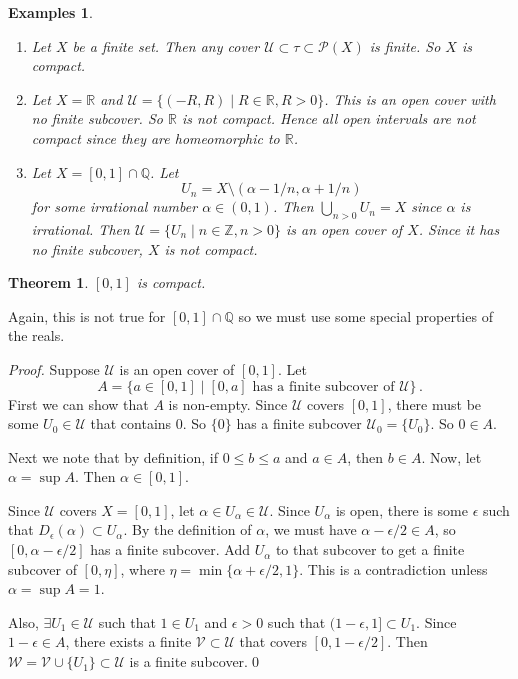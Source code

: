\documentclass{article}
\theoremstyle{plain}\theoremheaderfont{\normalfont\itshape}\theorembodyfont{\rmfamily}\theoremseparator{.}\newtheorem*{rem}{Remark}\newtheorem*{ex}{Example}\newtheorem*{proof}{Proof}\newtheorem*{altp}{Alternative proof}
\theoremstyle{plain}\theoremheaderfont{\normalfont\bfseries}\theorembodyfont{\rmfamily}\theoremseparator{.}\newtheorem{thm}{Theorem}[section]\newtheorem{lem}[thm]{Lemma}\newtheorem{prop}[thm]{Proposition}\newtheorem*{cor}{Corollary}\newtheorem{defn}[thm]{Definition}\newtheorem{clm}[thm]{Claim}\newtheorem{clminproof}{Claim}
\theoremstyle{break}\theoremheaderfont{\normalfont\itshape}\theorembodyfont{\rmfamily}\theoremseparator{.\medskip}\newtheorem*{proofskip}{Proof}\newtheorem*{exs}{Examples}\newtheorem*{rems}{Remarks}
\theoremstyle{break}\theoremheaderfont{\normalfont\bfseries}\theorembodyfont{\rmfamily}\theoremseparator{.\medskip}\newtheorem{lemskip}[thm]{Lemma}\newtheorem{defnskip}[thm]{Definition}\newtheorem{propskip}[thm]{Proposition}\newtheorem{thmskip}[thm]{Theorem}
\newcommand{\qed}{\hfill\ensuremath{\Box}}
\begin{document}
    \begin{exs}
        \begin{enumerate}[label=(\roman*),topsep=0pt]
            \item Let \(X\) be a finite set. Then any cover \(\mathscr{U}\subset\tau\subset\mathcal{P}(X)\) is finite. So \(X\) is compact.
            \item Let \(X=\mathbb{R}\) and \(\mathscr{U}=\{(-R,R)\mid R\in\mathbb{R},R>0\}\). This is an open cover with no finite subcover. So \(\mathbb{R}\) is not compact. Hence all open intervals are not compact since they are homeomorphic to \(\mathbb{R}\).
            \item Let \(X=[0,1]\cap\mathbb{Q}\). Let
            \[U_n=X\setminus (\alpha-1/n,\alpha+1/n)\]
            for some irrational number \(\alpha\in(0,1)\). Then \(\bigcup_{n>0}U_n=X\) since \(\alpha\) is irrational. Then \(\mathscr{U}=\{U_n\mid n\in\mathbb{Z},n>0\}\) is an open cover of \(X\). Since it has no finite subcover, \(X\) is not compact.
        \end{enumerate}
    \end{exs}

    \begin{thm}
        \([0,1]\) is compact.
    \end{thm}
    Again, this is not true for \([0,1]\cap\mathbb{Q}\) so we must use some special properties of the reals.
    \begin{proof}
        Suppose \(\mathscr{U}\) is an open cover of \([0,1]\). Let
        \[A=\{a\in[0,1]\mid [0,a]\text{ has a finite subcover of }\mathscr{U}\}\,.\]
        First we can show that \(A\) is non-empty. Since \(\mathscr{U}\) covers \([0,1]\), there must be some \(U_0\in\mathscr{U}\) that contains \(0\). So \(\{0\}\) has a finite subcover \(\mathscr{U}_0=\{U_0\}\). So \(0\in A\).

        Next we note that by definition, if \(0\le b\le a\) and \(a\in A\), then \(b\in A\). Now, let \(\alpha=\sup A\). Then \(\alpha\in[0,1]\).

        Since \(\mathscr{U}\) covers \(X=[0,1]\), let \(\alpha\in U_\alpha\in\mathscr{U}\). Since \(U_\alpha\) is open, there is some \(\epsilon\) such that \(D_\epsilon(\alpha)\subset U_\alpha\). By the definition of \(\alpha\), we must have \(\alpha-\epsilon/2\in A\), so \([0,\alpha-\epsilon/2]\) has a finite subcover. Add \(U_\alpha\) to that subcover to get a finite subcover of \([0,\eta]\), where \(\eta=\min\{\alpha+\epsilon/2,1\}\). This is a contradiction unless \(\alpha=\sup A=1\).

        Also, \(\exists U_1\in\mathscr{U}\) such that \(1\in U_1\) and \(\epsilon>0\) such that \((1-\epsilon,1]\subset U_1\). Since \(1-\epsilon\in A\), there exists a finite \(\mathscr{V}\subset\mathscr{U}\) that covers \([0,1-\epsilon/2]\). Then \(\mathscr{W}=\mathscr{V}\cup\{U_1\}\subset\mathscr{U}\) is a finite subcover.\qed
    \end{proof}
\end{document}
